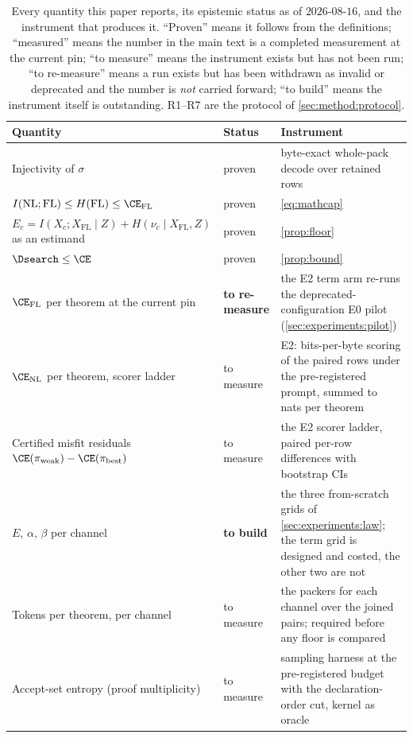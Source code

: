\begin{table}[t]
\centering
\small
\caption{Every quantity this paper reports, its epistemic status as of
\(2026\text{-}08\text{-}16\), and the instrument that produces it. ``Proven''
means it follows from the definitions; ``measured'' means the number in the main
text is a completed measurement at the current pin; ``to measure'' means the
instrument exists but has not been run; ``to re-measure'' means a run exists but
has been withdrawn as invalid or deprecated and the number is \emph{not} carried
forward; ``to build'' means the instrument itself is outstanding. R1--R7 are the
protocol of \cref{sec:method:protocol}.}
\label{tab:ledger}
\begin{tabular}{p{} p{} p{}}
\toprule
Quantity & Status & Instrument \\
\midrule
Injectivity of \(\sigma\) & proven & byte-exact whole-pack decode over retained rows \\
\(I(\mathrm{NL};\mathrm{FL}) \le H(\mathrm{FL}) \le \CE_{\mathrm{FL}}\) & proven & \cref{eq:mathcap} \\
\(E_c = I(X_c;X_{\mathrm{FL}}\mid Z) + H(\nu_c\mid X_{\mathrm{FL}}, Z)\) as an estimand & proven & \cref{prop:floor} \\
\(\Dsearch \le \CE\) & proven & \cref{prop:bound} \\
\(\CE_{\mathrm{FL}}\) per theorem at the current pin & \textbf{to re-measure} & the E2 term arm re-runs the deprecated-configuration E0 pilot (\cref{sec:experiments:pilot}) \\
\(\CE_{\mathrm{NL}}\) per theorem, scorer ladder & to measure & E2: bits-per-byte scoring of the paired rows under the pre-registered prompt, summed to nats per theorem \\
Certified misfit residuals \(\CE(\pi_{\mathrm{weak}})-\CE(\pi_{\mathrm{best}})\) & to measure & the E2 scorer ladder, paired per-row differences with bootstrap CIs \\
\(E\), \(\alpha\), \(\beta\) per channel & \textbf{to build} & the three from-scratch grids of \cref{sec:experiments:law}; the term grid is designed and costed, the other two are not \\
Tokens per theorem, per channel & to measure & the packers for each channel over the joined pairs; required before any floor is compared \\
Accept-set entropy (proof multiplicity) & to measure & sampling harness at the pre-registered budget with the declaration-order cut, kernel as oracle \\

\end{tabular}
\end{table}
